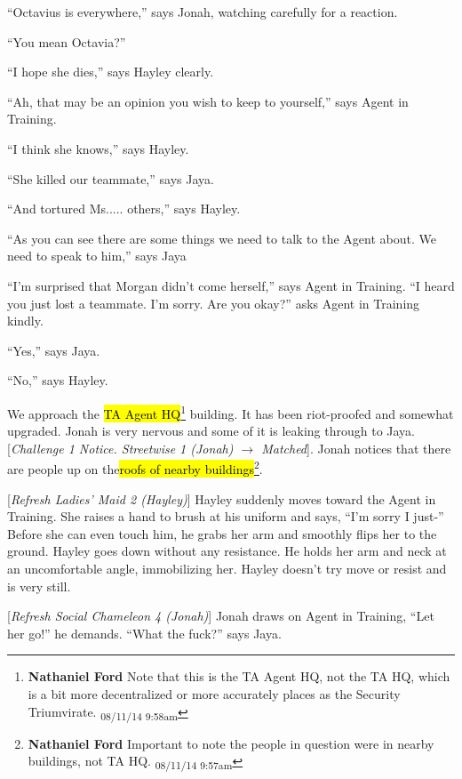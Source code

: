 ``Octavius is everywhere,'' says Jonah, watching carefully for a reaction.

``You mean Octavia?''

``I hope she dies,'' says Hayley clearly.

``Ah, that may be an opinion you wish to keep to yourself,'' says Agent in Training.

``I think she knows,'' says Hayley.

``She killed our teammate,'' says Jaya.

``And tortured Ms..... others,'' says Hayley.

``As you can see there are some things we need to talk to the Agent about.  We need to speak to him,'' says Jaya

``I'm surprised that Morgan didn't come herself,'' says Agent in Training.  ``I heard you just lost a teammate.  I'm sorry.  Are you okay?'' asks Agent in Training kindly.

``Yes,'' says Jaya.

``No,'' says Hayley.

\newpage
{}

We approach the \hl{TA Agent HQ}\footnote{\textbf{Nathaniel Ford }Note that this is the TA Agent HQ, not the TA HQ, which is a bit more decentralized or more accurately places as the Security Triumvirate. \textsubscript{08/11/14 9:58am}} building.  It has been riot-proofed and somewhat upgraded.  Jonah is very nervous and some of it is leaking through to Jaya.  {[}\textit{Challenge 1 Notice.  Streetwise 1 (Jonah) $\rightarrow$ Matched}{]}.  Jonah notices that there are people up on the\hl{roofs of nearby buildings}\footnote{\textbf{Nathaniel Ford }Important to note the people in question were in nearby buildings, not TA HQ. \textsubscript{08/11/14 9:57am}}.



{[}\textit{Refresh Ladies' Maid 2 (Hayley)}{]} Hayley suddenly moves toward the Agent in Training.  She raises a hand to brush at his uniform and says, ``I'm sorry I just-''  Before she can even touch him, he grabs her arm and smoothly flips her to the ground.  Hayley goes down without any resistance.  He holds her arm and neck at an uncomfortable angle, immobilizing her.  Hayley doesn't try move or resist and is very still. 



{[}\textit{Refresh Social Chameleon 4 (Jonah)}{]} Jonah draws on Agent in Training, ``Let her go!'' he demands.  ``What the fuck?'' says Jaya.  

